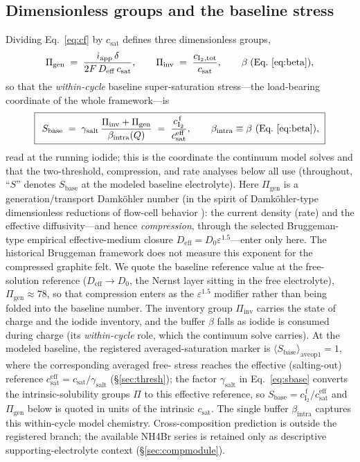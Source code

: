 \documentclass[11pt]{article}
\newcommand{\cf}{c_{\mathrm{I_2}}^{\,\mathrm{f}}}
\newcommand{\csat}{c_{\mathrm{sat}}}
\newcommand{\epsl}{\varepsilon}
\newcommand{\iapp}{i_{\mathrm{app}}}
\newcommand{\Deff}{D_{\mathrm{eff}}}
\begin{document}
\subsection{Dimensionless groups and the baseline stress}
Dividing Eq.~\eqref{eq:cf} by $\csat$ defines three dimensionless groups,
\begin{equation}
\Pi_{\mathrm{gen}} \;=\; \frac{\iapp\,\delta}{2F\,\Deff\,\csat},
\qquad
\Pi_{\mathrm{inv}} \;=\; \frac{c_{\mathrm{I_2,tot}}}{\csat},
\qquad
\beta \;\text{(Eq.~\ref{eq:beta})},
\label{eq:groups}
\end{equation}
so that the \emph{within-cycle} baseline super-saturation stress---the load-bearing coordinate of the whole
framework---is
\begin{equation}
\boxed{\;\,S_{\mathrm{base}} \;=\; \gamma_{\mathrm{salt}}\,\frac{\Pi_{\mathrm{inv}}+\Pi_{\mathrm{gen}}}{\beta_{\mathrm{intra}}(Q)}
\;=\; \frac{\cf}{\csat^{\mathrm{eff}}},
\qquad \beta_{\mathrm{intra}}\equiv\beta~(\text{Eq.~\ref{eq:beta}}),\;}
\label{eq:sbase}
\end{equation}
read at the running iodide; this is the coordinate the continuum model solves and that the two-threshold,
compression, and rate analyses below all use (throughout, ``$S$'' denotes $S_{\mathrm{base}}$ at the modeled
baseline electrolyte). Here $\Pi_{\mathrm{gen}}$ is a generation/transport Damk\"ohler number (in the spirit of
Damk\"ohler-type dimensionless reductions of flow-cell behavior \citep{DimAnalysis_CEJ2019}): the current
density (rate) and the effective diffusivity---and hence \emph{compression}, through the selected
Bruggeman-type empirical effective-medium closure $\Deff=D_0\epsl^{1.5}$---enter only here. The historical
Bruggeman framework \citep{Bruggeman1935} does not measure this exponent for the compressed graphite felt.
We quote the baseline reference value at the
free-solution reference ($\Deff\!\to\!D_0$, the Nernst layer sitting in the free electrolyte),
$\Pi_{\mathrm{gen}}\!\approx\!78$, so that compression enters as the $\epsl^{1.5}$ modifier rather than being
folded into the baseline number. The inventory group $\Pi_{\mathrm{inv}}$ carries the state of charge and the iodide inventory, and
the buffer $\beta$ falls as iodide is consumed during charge (its \emph{within-cycle} role, which the continuum
solve carries). At the modeled baseline, the registered averaged-saturation marker is
$\langle S_{\mathrm{base}}\rangle_{\mathrm{aveop1}}=1$, where the corresponding averaged free-
stress reaches the effective (salting-out) reference $\csat^{\mathrm{eff}}=\csat/\gamma_{\mathrm{salt}}$
(\S\ref{sec:thresh}); the factor $\gamma_{\mathrm{salt}}$ in Eq.~\eqref{eq:sbase} converts the intrinsic-solubility
groups $\Pi$ to this effective reference, so $S_{\mathrm{base}}=\cf/\csat^{\mathrm{eff}}$ and $\Pi_{\mathrm{gen}}$
below is quoted in units of the intrinsic $\csat$. The single buffer $\beta_{\mathrm{intra}}$ captures this
within-cycle model chemistry. Cross-composition prediction is outside the registered branch; the available
NH4Br series is retained only as descriptive supporting-electrolyte context (\S\ref{sec:compmodule}).
\end{document}
